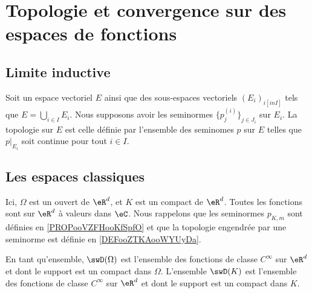 \section{Topologie et convergence sur des espaces de fonctions}

\subsection{Limite inductive}

\begin{definition}		\label{DEFooFCLUooSGJIKJ}
	Soit un espace vectoriel \( E\) ainsi que des sous-espaces vectoriels \( (E_i)_{i[in I]} \) tels que \( E=\bigcup_{i\in I}E_i\). Nous supposons avoir les seminormes \( \{ p_j^{(i)} \}_{j\in J_i}\) sur \( E_i\). La topologie  sur \( E\) est celle définie par l'ensemble des seminomes \( p\) sur \( E\) telles que \( p|_{E_i}\) soit continue pour tout \( i\in I\).
\end{definition}

\subsection{Les espaces classiques}


\begin{normaltext}
	Ici, \( \Omega\) est un ouvert de \( \eR^d\), et \( K\) est un compact de \( \eR^d\). Toutes les fonctions sont sur \( \eR^d\) à valeurs dans \( \eC\). Nous rappelons que les seminormes \( p_{K,m}\) sont définies en \ref{PROPooVZFHooKfSpfO} et que la topologie engendrée par une seminorme est définie en \ref{DEFooZTKAooWYUyDa}.

	En tant qu'ensemble, \( \swD(\Omega)\) est l'ensemble des fonctions de classe \(  C^{\infty}\) sur \( \eR^d\) et dont le support est un compact dans \( \Omega\). L'ensemble \( \swD(K)\) est l'ensemble des fonctions de classe \(  C^{\infty}\) sur \( \eR^d\) et dont le support est un compact dans \( K\).
\end{normaltext}

